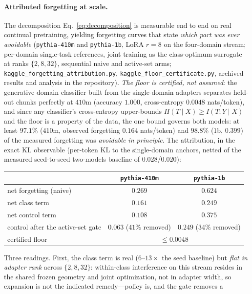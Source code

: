 \documentclass[10pt,a4paper]{article}
\theoremstyle{plain}
\theoremstyle{definition}
\begin{document}
\paragraph{Attributed forgetting at scale.} The decomposition
Eq.~\eqref{eq:decomposition} is measurable end to end on real continual pretraining,
yielding forgetting curves that state \emph{which part was ever avoidable}
(\texttt{pythia-410m} and \texttt{pythia-1b}, LoRA $r{=}8$ on the four-domain stream;
per-domain single-task references, joint training as the class-optimum surrogate at
ranks $\{2,8,32\}$, sequential naive and active-set arms;
\texttt{kaggle\_forgetting\_attribution.py}, \texttt{kaggle\_floor\_certificate.py},
archived results and analysis in the repository). \emph{The floor is certified, not
assumed}: the generative domain classifier built from the single-domain adapters
separates held-out chunks perfectly at $410$m (accuracy $1.000$, cross-entropy
$0.0048$ nats/token), and since any classifier's cross-entropy upper-bounds
$H(T\mid X)\ge I(T;Y\mid X)$ and the floor is a property of the data, the one bound
governs both models: at least $97.1\%$ ($410$m, observed forgetting $0.164$ nats/token)
and $98.8\%$ ($1$b, $0.399$) of the measured forgetting was \emph{avoidable in
principle}. The attribution, in the exact KL observable (per-token
$\mathrm{KL}$ to the single-domain anchors, netted of the measured seed-to-seed
two-models baseline of $0.028$/$0.020$):
\begin{center}\small
\begin{tabular}{lcc}
\toprule
 & \texttt{pythia-410m} & \texttt{pythia-1b} \\
\midrule
net forgetting (naive) & $0.269$ & $0.624$ \\
net class term & $0.161$ & $0.249$ \\
net control term & $0.108$ & $0.375$ \\
control after the active-set gate & $0.063$ ($41\%$ removed) & $0.249$ ($34\%$ removed) \\
certified floor & \multicolumn{2}{c}{$\le 0.0048$} \\
\bottomrule
\end{tabular}
\end{center}
Three readings. First, the class term is real ($6$--$13\times$ the seed baseline) but
\emph{flat in adapter rank} across $\{2,8,32\}$: within-class interference on this
stream resides in the shared frozen geometry and joint optimization, not in adapter
width, so expansion is not the indicated remedy---policy is, and the gate removes a
\end{document}
